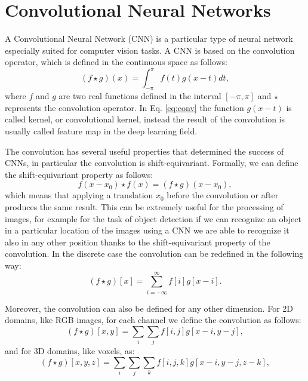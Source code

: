 \documentclass[binding=0.6cm,noexaminfo]{sapthesis}
\begin{document}
\section{Convolutional Neural Networks}\label{sec:cnn}

A Convolutional Neural Network (CNN) is a particular type of neural network especially suited for computer vision tasks. A CNN is based on the convolution operator, which is defined in the continuous space as follows:
\begin{equation}
(f \star g)(x) = \int_{-\pi}^{\pi} f(t) g(x-t) dt,
\label{eq:conv}
\end{equation}
where $f$ and $g$ are two real functions defined in the interval $[-\pi, \pi]$ and $\star$ represents the convolution operator.
In Eq. \ref{eq:conv} the function $g(x-t)$ is called kernel, or convolutional kernel, instead the result of the convolution is usually called feature map in the deep learning field.

The convolution has several useful properties that determined the success of CNNs, in particular the convolution is shift-equivariant. Formally, we can define the shift-equivariant property as follows:
\begin{equation}
f(x - x_0) \star f(x) = (f \star g)(x-x_0),
\end{equation}
which means that applying a translation $x_0$ before the convolution or after produces the same result. This can be extremely useful for the processing of images, for example for the task of object detection if we can recognize an object in a particular location of the images using a CNN we are able to recognize it also in any other position thanks to the shift-equivariant property of the convolution.
In the discrete case the convolution can be redefined in the following way:
\begin{equation}
(f \star g)[x] = \sum_{i=-\infty}^{\infty} f[i]g[x-i].
\end{equation}

Moreover, the convolution can also be defined for any other dimension. For 2D domains, like RGB images, for each channel we define the convolution as follows:
\begin{equation}
(f \star g)[x, y] = \sum_i \sum_j f[i, j] g[x-i, y-j],
\end{equation}
and for 3D domains, like voxels, as:
\begin{equation}
(f \star g)[x, y, z] = \sum_i \sum_j \sum_k f[i, j, k] g[x-i, y-j, z-k],
\end{equation}
\end{document}
